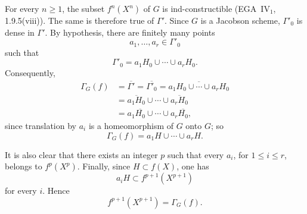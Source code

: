 For every \(n\geq1\), the subset \(f^n(X^n)\) of \(G\) is
ind-constructible (EGA~IV\(_1\), 1.9.5\textup{(viii)}).
The same is therefore true of \(\Gamma'\). Since \(G\) is a
Jacobson scheme, \(\Gamma'_0\) is dense in \(\Gamma'\). By
hypothesis, there are finitely many points
\[
  a_1,\ldots,a_r\in\Gamma'_0
\]
such that
\[
  \Gamma'_0=a_1H_0\cup\cdots\cup a_rH_0.
\]
Consequently,
\label{form:sga3-VIB-7.7-closure-chain}%
\[
\begin{aligned}
  \Gamma_G(f)
    &=\overline{\Gamma'}
     =\overline{\Gamma'_0}
     =\overline{a_1H_0\cup\cdots\cup a_rH_0}\\
    &=\overline{a_1H_0}\cup\cdots\cup\overline{a_rH_0}\\
    &=a_1\overline{H_0}\cup\cdots\cup
      a_r\overline{H_0},
\end{aligned}
\]
since translation by \(a_i\) is a homeomorphism of \(G\) onto
\(G\); so
\[
  \Gamma_G(f)=a_1H\cup\cdots\cup a_rH.
\]

It is also clear that there exists an integer \(p\) such that
every \(a_i\), for \(1\leq i\leq r\), belongs to
\(f^p(X^p)\). Finally, since \(H\subset f(X)\), one has
\[
  a_iH\subset f^{p+1}(X^{p+1})
\]
for every \(i\). Hence
\[
  f^{p+1}(X^{p+1})=\Gamma_G(f).
\]
